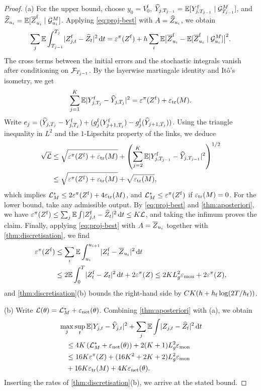 \begin{proof}

(a) For the upper bound, choose $y_0=V^{\mathrm f}_0$, $\widehat Y_{j,T_{j-1}}=\mathbb{E}[Y^{\mathrm f}_{j,T_{j-1}}\mid\mathcal{G}^{M}_{T_{j-1}}]$, and $\widehat Z_{u_i}=\mathbb{E}[\overline Z^{\mathrm f}_{u_i}\mid\mathcal{G}^{M}_{u_i}]$. Applying \eqref{eq:proj-best} with $A=\widehat Z_{u_i}$, we obtain
\[
\sum_j\mathbb{E}\int_{T_{j-1}}^{T_j}\lvert Z^{\mathrm f}_{j,t}-\widehat Z_t\rvert^2\,\mathrm{d} t=\varepsilon^\pi(Z^{\mathrm f})+h\sum_i\mathbb{E}\bigl\lvert\overline Z^{\mathrm f}_{u_i}-\mathbb{E}[\overline Z^{\mathrm f}_{u_i}\mid\mathcal{G}^{M}_{u_i}]\bigr\rvert^2 .
\]
The cross terms between the initial errors and the stochastic integrals vanish after conditioning on $\mathcal{F}_{T_{j-1}}$. By the layerwise martingale identity and It\^o's isometry, we get
\[
\sum_{j=1}^K\mathbb{E}\lvert Y^{\mathrm f}_{j,T_j}-\widehat Y_{j,T_j}\rvert^2=\varepsilon^\pi(Z^{\mathrm f})+\varepsilon_{\mathrm{tr}}(M).
\]
Write $e_j=(\widehat Y_{j,T_j}-Y^{\mathrm f}_{j,T_j})+(g^{\mathrm f}_j(Y^{\mathrm f}_{j+1,T_j})-g^{\mathrm f}_j(\widehat Y_{j+1,T_j}))$. Using the triangle inequality in $L^2$ and the $1$-Lipschitz property of the links, we deduce
\[
\begin{aligned}\sqrt{\mathcal{L}}&\le\sqrt{\varepsilon^\pi(Z^{\mathrm f})+\varepsilon_{\mathrm{tr}}(M)}+\left(\sum_{j=2}^K\mathbb{E}\lvert Y^{\mathrm f}_{j,T_{j-1}}-\widehat Y_{j,T_{j-1}}\rvert^2\right)^{1/2}\\&\le\sqrt{\varepsilon^\pi(Z^{\mathrm f})+\varepsilon_{\mathrm{tr}}(M)}+\sqrt{\varepsilon_{\mathrm{tr}}(M)},\end{aligned}
\]
which implies $\mathcal{L}^{*}_{M}\le2\varepsilon^\pi(Z^{\mathrm f})+4\varepsilon_{\mathrm{tr}}(M)$, and $\mathcal{L}^{*}_{M}\le\varepsilon^\pi(Z^{\mathrm f})$ if $\varepsilon_{\mathrm{tr}}(M)=0$. For the lower bound, take any admissible output. By \eqref{eq:proj-best} and \cref{thm:aposteriori}, we have $\varepsilon^\pi(Z^{\mathrm f})\le\sum_j\mathbb{E}\int\lvert Z^{\mathrm f}_{j,t}-\widehat Z_t\rvert^2\,\mathrm{d} t\le K\mathcal{L}$, and taking the infimum proves the claim. Finally, applying \eqref{eq:proj-best} with $A=\overline Z_{u_i}$ together with \cref{thm:discretisation}, we find
\[
\begin{aligned}\varepsilon^\pi(Z^{\mathrm f})&\le\sum_i\mathbb{E}\int_{u_i}^{u_{i+1}}\lvert Z^{\mathrm f}_t-\overline Z_{u_i}\rvert^2\,\mathrm{d} t\\&\le2\mathbb{E}\int_0^T\lvert Z^{\mathrm f}_t-Z_t\rvert^2\,\mathrm{d} t+2\varepsilon^\pi(Z)\le2KL_g^2\varepsilon_{\mathrm{mon}}+2\varepsilon^\pi(Z),\end{aligned}
\]
and \cref{thm:discretisation}(b) bounds the right-hand side by $CK(h+h_{\mathrm f}\log(2T/h_{\mathrm f}))$.

(b) Write $\mathcal{L}(\theta)=\mathcal{L}^{*}_{M}+\varepsilon_{\mathrm{net}}(\theta)$. Combining \cref{thm:aposteriori} with (a), we obtain
\begin{align*}
&\max_j\sup_t\mathbb{E}\lvert Y_{j,t}-\widehat Y_{j,t}\rvert^2+\sum_j\mathbb{E}\int\lvert Z_{j,t}-\widehat Z_t\rvert^2\,\mathrm{d} t\\
&\quad\le4K\left(\mathcal{L}^{*}_{M}+\varepsilon_{\mathrm{net}}(\theta)\right)+2(K+1)L_g^2\varepsilon_{\mathrm{mon}}\\
&\quad\le16K\varepsilon^\pi(Z)+(16K^2+2K+2)L_g^2\varepsilon_{\mathrm{mon}}\\&\quad+16K\varepsilon_{\mathrm{tr}}(M)+4K\varepsilon_{\mathrm{net}}(\theta).
\end{align*}
Inserting the rates of \cref{thm:discretisation}(b), we arrive at the stated bound.
\end{proof}

